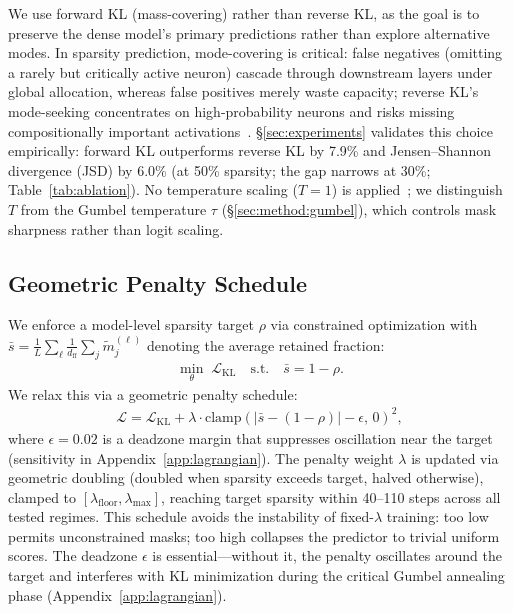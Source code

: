 We use forward KL (mass-covering) rather than reverse KL, as the goal is to preserve the dense model's primary predictions rather than explore alternative modes.
In sparsity prediction, mode-covering is critical: false negatives (omitting a rarely but critically active neuron) cascade through downstream layers under global allocation, whereas false positives merely waste capacity; reverse KL's mode-seeking concentrates on high-probability neurons and risks missing compositionally important activations~\cite{wu2025rethinking}.
\S\ref{sec:experiments} validates this choice empirically: forward KL outperforms reverse KL by 7.9\% and Jensen--Shannon divergence (JSD) by 6.0\% (at 50\% sparsity; the gap narrows at 30\%; Table~\ref{tab:ablation}).
No temperature scaling ($T{=}1$) is applied~\cite{hinton2015distilling}; we distinguish $T$ from the Gumbel temperature $\tau$ (\S\ref{sec:method:gumbel}), which controls mask sharpness rather than logit scaling.


\subsection{Geometric Penalty Schedule}
\label{sec:method:lagrangian}

We enforce a model-level sparsity target $\rho$ via constrained optimization with $\bar{s} = \frac{1}{L} \sum_\ell \frac{1}{d_{\text{ff}}} \sum_j \tilde{m}_j^{(\ell)}$ denoting the average retained fraction:
\begin{align}
\min_\theta \; \mathcal{L}_{\text{KL}} \quad \text{s.t.} \quad \bar{s} = 1 - \rho.
\label{eq:constrained}
\end{align}
We relax this via a geometric penalty schedule:
\begin{align}
\mathcal{L} = \mathcal{L}_{\text{KL}} + \lambda \!\cdot\! \text{clamp}(|\bar{s} {-} (1{-}\rho)| {-} \epsilon,\, 0)^2,
\label{eq:lagrangian}
\end{align}
where $\epsilon = 0.02$ is a deadzone margin that suppresses oscillation near the target (sensitivity in Appendix~\ref{app:lagrangian}). The penalty weight $\lambda$ is updated via geometric doubling (doubled when sparsity exceeds target, halved otherwise), clamped to $[\lambda_{\text{floor}}, \lambda_{\max}]$, reaching target sparsity within 40--110 steps across all tested regimes.
This schedule avoids the instability of fixed-$\lambda$ training: too low permits unconstrained masks; too high collapses the predictor to trivial uniform scores.
The deadzone $\epsilon$ is essential---without it, the penalty oscillates around the target and interferes with KL minimization during the critical Gumbel annealing phase (Appendix~\ref{app:lagrangian}).


